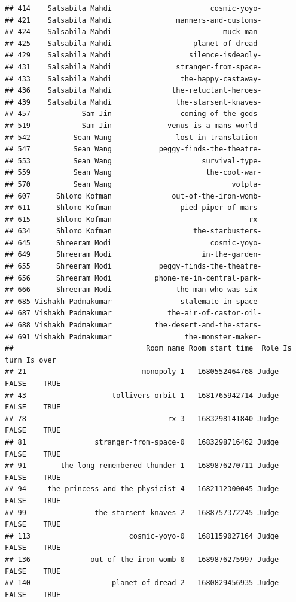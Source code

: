 \documentclass[
]{article}
\begin{document}
\begin{verbatim}
## 414    Salsabila Mahdi                       cosmic-yoyo-
## 421    Salsabila Mahdi               manners-and-customs-
## 424    Salsabila Mahdi                          muck-man-
## 425    Salsabila Mahdi                   planet-of-dread-
## 429    Salsabila Mahdi                  silence-isdeadly-
## 431    Salsabila Mahdi               stranger-from-space-
## 433    Salsabila Mahdi                the-happy-castaway-
## 436    Salsabila Mahdi              the-reluctant-heroes-
## 439    Salsabila Mahdi               the-starsent-knaves-
## 457            Sam Jin                coming-of-the-gods-
## 519            Sam Jin             venus-is-a-mans-world-
## 542          Sean Wang               lost-in-translation-
## 547          Sean Wang           peggy-finds-the-theatre-
## 553          Sean Wang                     survival-type-
## 559          Sean Wang                      the-cool-war-
## 570          Sean Wang                            volpla-
## 607      Shlomo Kofman              out-of-the-iron-womb-
## 611      Shlomo Kofman                pied-piper-of-mars-
## 615      Shlomo Kofman                                rx-
## 634      Shlomo Kofman                   the-starbusters-
## 645      Shreeram Modi                       cosmic-yoyo-
## 649      Shreeram Modi                     in-the-garden-
## 655      Shreeram Modi           peggy-finds-the-theatre-
## 656      Shreeram Modi          phone-me-in-central-park-
## 666      Shreeram Modi               the-man-who-was-six-
## 685 Vishakh Padmakumar                stalemate-in-space-
## 687 Vishakh Padmakumar             the-air-of-castor-oil-
## 688 Vishakh Padmakumar          the-desert-and-the-stars-
## 691 Vishakh Padmakumar                 the-monster-maker-
##                               Room name Room start time  Role Is turn Is over
## 21                           monopoly-1   1680552464768 Judge   FALSE    TRUE
## 43                    tollivers-orbit-1   1681765942714 Judge   FALSE    TRUE
## 78                                 rx-3   1683298141840 Judge   FALSE    TRUE
## 81                stranger-from-space-0   1683298716462 Judge   FALSE    TRUE
## 91        the-long-remembered-thunder-1   1689876270711 Judge   FALSE    TRUE
## 94     the-princess-and-the-physicist-4   1682112300045 Judge   FALSE    TRUE
## 99                the-starsent-knaves-2   1688757372245 Judge   FALSE    TRUE
## 113                       cosmic-yoyo-0   1681159027164 Judge   FALSE    TRUE
## 136              out-of-the-iron-womb-0   1689876275997 Judge   FALSE    TRUE
## 140                   planet-of-dread-2   1680829456935 Judge   FALSE    TRUE

\end{verbatim}
\end{document}
